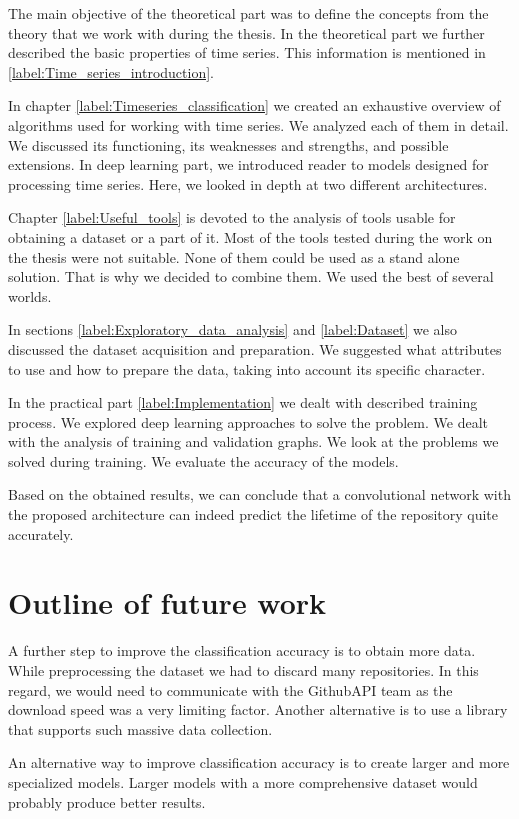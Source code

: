 \documentclass[thesis=M,english]{FITthesis}[2019/12/23]
\begin{document}
The main objective of the theoretical part was to define the concepts from the theory that we work with during the thesis. In the theoretical part we further described the basic properties of time series. This information is mentioned in \ref{label:Time_series_introduction}.

In chapter \ref{label:Timeseries_classification} we created an exhaustive overview of algorithms used for working with time series. We analyzed each of them in detail. We discussed its functioning, its weaknesses and strengths, and possible extensions. In deep learning part, we introduced reader to models designed for processing time series. Here, we looked in depth  at two different architectures.

Chapter \ref{label:Useful_tools} is devoted to the analysis of tools usable for obtaining a dataset or a part of it. Most of the tools tested during the work on the thesis were not suitable. None of them could be used as a stand alone solution. That is why we decided to combine them. We used the best of several worlds.

In sections \ref{label:Exploratory_data_analysis} and \ref{label:Dataset} we also discussed the dataset acquisition and preparation. We suggested what attributes to use and how to prepare the data, taking into account its specific character.

In the practical part \ref{label:Implementation} we dealt with described training process. We explored deep learning approaches to solve the problem. We dealt with the analysis of training and validation graphs. We look at the problems we solved during training. We evaluate the accuracy of the models.

Based on the obtained results, we can conclude that a convolutional network with the proposed architecture can indeed predict the lifetime of the repository quite accurately.

\section{Outline of future work}
A further step to improve the classification accuracy is to obtain more data. While preprocessing the dataset we had to discard many repositories. In this regard, we would need to communicate with the GithubAPI team as the download speed was a very limiting factor. Another alternative is to use a library that supports such massive data collection. 

An alternative way to improve classification accuracy is to create larger and more specialized models. Larger models with a more comprehensive dataset would probably produce better results.
\end{document}
